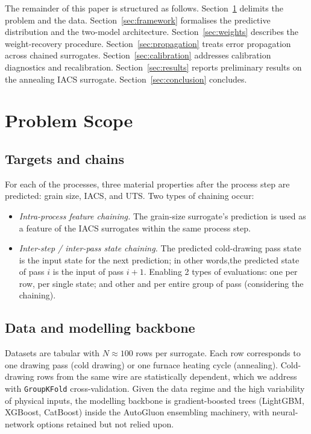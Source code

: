 \documentclass[conference]{IEEEtran}
\begin{document}
The remainder of this paper is structured as follows. Section~\ref{sec:scope} delimits the problem and the data. Section~\ref{sec:framework} formalises the predictive distribution and the two-model architecture. Section~\ref{sec:weights} describes the weight-recovery procedure. Section~\ref{sec:propagation} treats error propagation across chained surrogates. Section~\ref{sec:calibration} addresses calibration diagnostics and recalibration. Section~\ref{sec:results} reports preliminary results on the annealing IACS surrogate. Section~\ref{sec:conclusion} concludes.

\section{Problem Scope}
\label{sec:scope}

\subsection{Targets and chains}

For each of the processes, three material properties after the process step are predicted: grain size, IACS, and UTS. Two types of chaining occur:

\begin{itemize}
    \item \emph{Intra-process feature chaining.} The grain-size surrogate's prediction is used as a feature of the IACS surrogates within the same process step.
    \item \emph{Inter-step / inter-pass state chaining.} The predicted cold-drawing pass state is the input state for the next prediction; in other words,the predicted state of pass $i$ is the input of pass $i+1$. Enabling 2 types of evaluations: one per row, per single state; and other and per entire group of pass (considering the chaining).
\end{itemize}

\subsection{Data and modelling backbone}

Datasets are tabular with $N \approx 100$ rows per surrogate. Each row corresponds to one drawing pass (cold drawing) or one furnace heating cycle (annealing). Cold-drawing rows from the same wire are statistically dependent, which we address with \texttt{GroupKFold} cross-validation. Given the data regime and the high variability of physical inputs, the modelling backbone is gradient-boosted trees (LightGBM, XGBoost, CatBoost) inside the AutoGluon ensembling machinery, with neural-network options retained but not relied upon.
\end{document}
